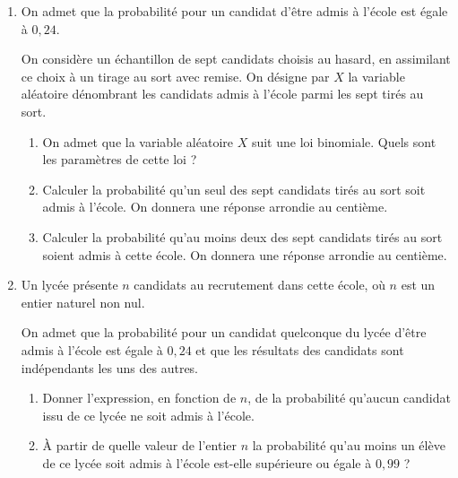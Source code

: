 \begin{enumerate}
	\item On admet que la probabilité pour un candidat d’être admis à l’école est égale à $0,24$.
	
	On considère un échantillon de sept candidats choisis au hasard, en assimilant ce choix à un tirage au sort avec remise. On désigne par $X$ la variable aléatoire dénombrant les candidats admis à l’école parmi les sept tirés au sort.
	\begin{enumerate}
		\item On admet que la variable aléatoire $X$ suit une loi binomiale. Quels sont les paramètres de cette loi ?
		\item Calculer la probabilité qu’un seul des sept candidats tirés au sort soit admis à l’école. On donnera une réponse arrondie au centième.
		\item Calculer la probabilité qu’au moins deux des sept candidats tirés au sort soient admis à cette école. On donnera une réponse arrondie au centième. 
	\end{enumerate}
	\item Un lycée présente $n$ candidats au recrutement dans cette école, où $n$ est un entier naturel non nul.
	
	On admet que la probabilité pour un candidat quelconque du lycée d’être admis à l’école est égale à $0,24$ et que les résultats des candidats sont indépendants les uns des autres. 
	\begin{enumerate}
		\item Donner l’expression, en fonction de $n$, de la probabilité qu’aucun candidat issu de ce lycée ne soit admis à l’école.
		\item À partir de quelle valeur de l’entier $n$ la probabilité qu’au moins un élève de ce lycée soit admis à l’école est-elle supérieure ou égale à $0,99$ ? 
	\end{enumerate}
\end{enumerate}

